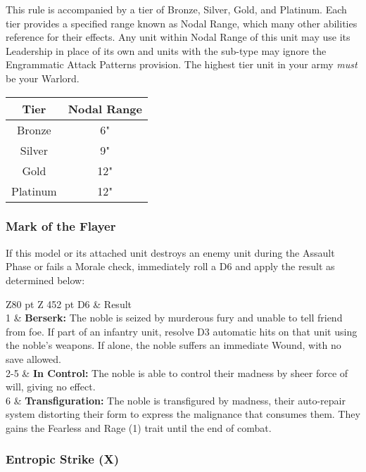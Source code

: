 \begin{multicols}{2}
This rule is accompanied by a tier of Bronze, Silver, Gold, and Platinum. Each tier provides a specified range known as Nodal Range, which many other abilities reference for their effects. Any unit within Nodal Range of this unit may use its Leadership in place of its own and units with the  sub-type may ignore the Engrammatic Attack Patterns provision. The highest tier unit in your army \textit{must} be your Warlord.

\label{Nodal Range}
\begin{tabular}{|c|c|}
	\hline
	Tier & Nodal Range \\
	\hline
	Bronze & 6" \\
	Silver & 9" \\
	Gold & 12" \\
	Platinum & 12" \\
	\hline
\end{tabular}

\subsubsection{Mark of the Flayer} \label{Mark of the Flayer}

If this model or its attached unit destroys an enemy unit during the Assault Phase or fails a Morale check, immediately roll a D6 and apply the result as determined below: \\
\begin{tabular}{Z{80 pt} Z {452 pt}}
	D6 & Result \\
	1 & \textbf{Berserk:} The noble is seized by murderous fury and unable to tell friend from foe. If part of an infantry unit, resolve D3 automatic hits on that unit using the noble's weapons. If alone, the noble suffers an immediate Wound, with no save allowed. \\
	2-5 & \textbf{In Control:} The noble is able to control their madness by sheer force of will, giving no effect. \\
	6 & \textbf{Transfiguration:} The noble is transfigured by madness, their auto-repair system distorting their form to express the malignance that consumes them. They gains the Fearless and Rage (1) trait until the end of combat. \\
\end{tabular}


\subsubsection{Entropic Strike (X)} \label{Entropic Strike}


\end{multicols}
